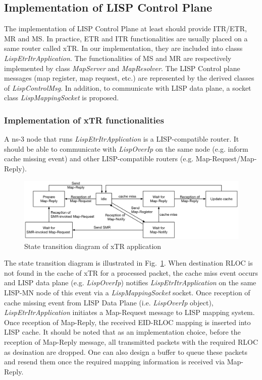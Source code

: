 \subsection{Implementation of LISP Control Plane}
\label{subsec:control-plane-impl}
The implementation of LISP Control Plane at least should provide ITR/ETR, MR and MS. In practice, ETR and ITR functionalities are usually placed on a same router called xTR. In our implementation, they are included into classs \emph{LispEtrItrApplication}.
The functionalities of MS and MR are respectively implemented by class \emph{MapServer} and \emph{MapResolver}. The LISP Control plane messages (map register, map request, etc.) are represented by the derived classes of \emph{LispControlMsg}. In addition, to communicate with LISP data plane, a socket class \emph{LispMappingSocket} is proposed.

\subsubsection{Implementation of xTR functionalities}
 A ns-3 node that runs \emph{LispEtrItrApplication} is a LISP-compatible router. It should be able to communicate with \emph{LispOverIp} on the same node (e.g. inform cache missing event) and other LISP-compatible routers (e.g. Map-Request/Map-Reply). 
\begin{figure}[!t]
	\centering
	\includegraphics[width=\textwidth]{Pics/xTR_state_transition.eps}
	\caption{State transition diagram of xTR application}
	\label{fig:xTR-state-transition}
\end{figure}
The state transition diagram is illustrated in Fig.~\ref{fig:xTR-state-transition}. When destination RLOC is not found in the cache of xTR for a processed packet, the cache miss event occurs and LISP data plane (e.g. \emph{LispOverIp}) notifies \emph{LispEtrItrApplication} on the same LISP-MN node of this event via a \emph{LispMappingSocket} socket. Once reception of cache missing event from LISP Data Plane (i.e. \emph{LispOverIp} object), \emph{LispEtrItrApplication} initiates a Map-Request message to LISP mapping system. Once reception of Map-Reply, the received EID-RLOC mapping is inserted into LISP cache. 
It should be noted that as an implementation choice, before the reception of Map-Reply message, all transmitted packets with the required RLOC as desination are dropped. One can also design a buffer to queue these packets and resend them once the required mapping information is received via Map-Reply.

